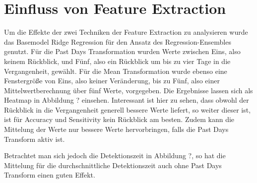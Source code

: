 \section{Einfluss von Feature Extraction}

Um die Effekte der zwei Techniken der Feature Extraction zu analysieren wurde das Basemodel Ridge Regression
 für den Ansatz des Regression-Ensembles genutzt. Für die Past Days Transformation wurden Werte zwischen Eins,
 also keinem Rückblick, und Fünf, also ein Rückblick um bis zu vier Tage in die Vergangenheit, gewählt. Für
 die Mean Transformation wurde ebenso eine Fenstergröße von Eins, also keiner Veränderung, bis zu Fünf, also
 einer Mittelwertberechnung über fünf Werte, vorgegeben. Die Ergebnisse lassen sich als Heatmap in
 Abbildung ? einsehen. Interessant ist hier zu sehen, dass obwohl der Rückblick in die Vergangenheit generell
 bessere Werte liefert, so weiter dieser ist, ist für Accuracy und Sensitivity kein Rückblick am besten. Zudem
 kann die Mittelung der Werte nur bessere Werte hervorbringen, falls die Past Days Transform aktiv ist.

 Betrachtet man sich jedoch die Detektionszeit in Abbildung ?, so hat die Mittelung für die
  durchschnittliche Detektionszeit auch ohne Past Days Transform einen guten Effekt.